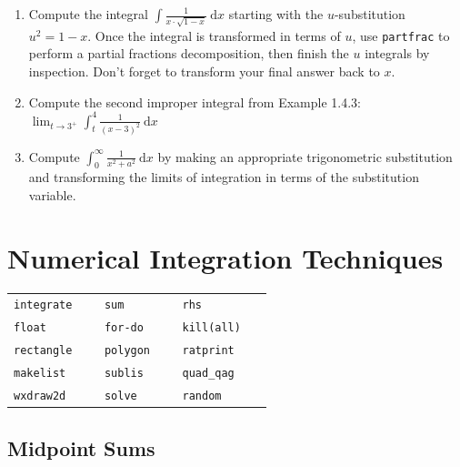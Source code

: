 \documentclass[10.5pt,twoside]{report}
\theoremstyle{definition}
\begin{document}
\begin{enumerate}
\item Compute the integral $\displaystyle \int \frac{1}{x\cdot \sqrt{1-x}}\ \mathrm{d}x$ starting with the $u$-substitution $u^2=1-x$.  Once the integral is transformed in terms of $u$, use \verb|partfrac| to perform a partial fractions decomposition, then finish the $u$ integrals by inspection.  Don't forget to transform your final answer back to $x$.

\item Compute the second improper integral from Example 1.4.3:  $\displaystyle \lim_{t \to 3^+} \displaystyle \int_t^4 \frac{1}{(x-3)^2}\ \mathrm{d}x$


\item Compute $\displaystyle \int_0^{\infty} \frac{1}{x^2+a^2}\ \mathrm{d}x$ by making an appropriate trigonometric substitution and transforming the limits of integration in terms of the substitution variable.



\end{enumerate}

\pagebreak

\chapter{Numerical Integration Techniques}

\vspace*{\fill}

\minitoc

\vspace*{\fill}


\newline
\newline

\begin{tabular}{l l l}
 \verb|integrate   |   &\verb|sum   |   &\verb|rhs   |   \\
 \verb|float   |   &\verb|for-do   |   &\verb|kill(all)   |   \\
 \verb|rectangle   |   &\verb|polygon   |   &\verb|ratprint   |   \\
 \verb|makelist   |   &\verb|sublis   |   &\verb|quad_qag   |   \\
 \verb|wxdraw2d   |   &\verb|solve   |   &\verb|random   |   \\
\end{tabular}



\pagebreak
\section{Midpoint Sums}\label{Midpoint Sums}
\end{document}
